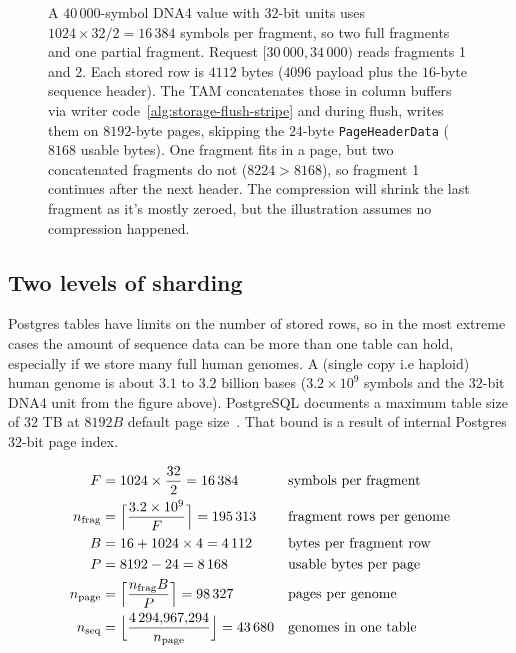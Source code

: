 \begin{figure}[htbp]
\caption{A $40\,000$-symbol DNA4 value with $32$-bit units uses
$1024 \times 32/2 = 16\,384$ symbols per fragment, so two full fragments and
one partial fragment. Request $[30\,000,34\,000)$ reads fragments 1 and 2.
Each stored row is $4112$ bytes ($4096$ payload plus the $16$-byte sequence
header). The TAM concatenates those in column buffers via writer code~\ref{alg:storage-flush-stripe} and during flush,
writes them on $8192$-byte pages, skipping the $24$-byte
\texttt{PageHeaderData} ($8168$ usable bytes). One fragment fits in a page, but two concatenated fragments do not ($8224>8168$), so fragment 1 continues
after the next header. The compression will shrink the last fragment as it's mostly zeroed, but the illustration assumes no compression happened.}
\label{fig:sequence-fragment-flow}
\end{figure}

\subsection{Two levels of sharding}

Postgres tables have limits on the number of stored rows, so in the most
extreme cases the amount of sequence data can be more than one table can hold,
especially if we store many full human genomes.
A (single copy i.e haploid) human genome is about $3.1$ to $3.2$ billion bases ($3.2\times 10^{9}$ symbols and the $32$-bit DNA4 unit from the figure above).
PostgreSQL documents a maximum table size of $32$ TB at $8192B$ default page size~\autocite{postgresql17_limits}. That
bound is a result of internal Postgres $32$-bit page index.

\begin{equation}
\begin{aligned}
  F &= 1024 \times \frac{32}{2} = 16\,384
    && \text{symbols per fragment}\\
  n_{\mathrm{frag}} &= \Bigl\lceil \frac{3.2\times 10^{9}}{F} \Bigr\rceil = 195\,313
    && \text{fragment rows per genome}\\
  B &= 16 + 1024 \times 4 = 4\,112
    && \text{bytes per fragment row}\\
  P &= 8192 - 24 = 8\,168
    && \text{usable bytes per page}\\
  n_{\mathrm{page}} &= \Bigl\lceil \frac{n_{\mathrm{frag}} B}{P} \Bigr\rceil = 98\,327
    && \text{pages per genome}\\
  n_{\mathrm{seq}} &= \Bigl\lfloor \frac{4\,294{,}967{,}294}{n_{\mathrm{page}}} \Bigr\rfloor = 43\,680
    && \text{genomes in one table}
\end{aligned}
\label{eq:storage-human-genome-table-cap}
\end{equation}

